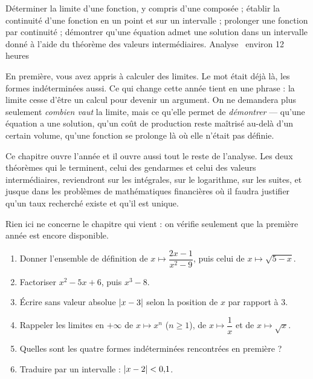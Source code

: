   {Déterminer la limite d'une fonction, y compris d'une composée ; établir la
   continuité d'une fonction en un point et sur un intervalle ; prolonger une
   fonction par continuité ; démontrer qu'une équation admet une solution dans
   un intervalle donné à l'aide du théorème des valeurs intermédiaires.}
  {Analyse \textbullet\ environ 12 heures}

En première, vous avez appris à calculer des limites. Le mot était déjà là,
les formes indéterminées aussi. Ce qui change cette année tient en une
phrase : la limite cesse d'être un calcul pour devenir un argument. On ne
demandera plus seulement \emph{combien vaut} la limite, mais ce qu'elle permet
de \emph{démontrer} — qu'une équation a une solution, qu'un coût de
production reste maîtrisé au-delà d'un certain volume, qu'une fonction se
prolonge là où elle n'était pas définie.

Ce chapitre ouvre l'année et il ouvre aussi tout le reste de l'analyse. Les
deux théorèmes qui le terminent, celui des gendarmes et celui des valeurs
intermédiaires, reviendront sur les intégrales, sur le logarithme, sur les
suites, et jusque dans les problèmes de mathématiques financières où il
faudra justifier qu'un taux recherché existe et qu'il est unique.

\begin{revision}
Rien ici ne concerne le chapitre qui vient : on vérifie seulement que la
première année est encore disponible.

\begin{enumerate}[label=\textbf{\arabic*.}, leftmargin=*, itemsep=0.35em]
  \item Donner l'ensemble de définition de $x \mapsto \dfrac{2x-1}{x^{2}-9}$,
        puis celui de $x \mapsto \sqrt{5-x}$.
  \item Factoriser $x^{2}-5x+6$, puis $x^{3}-8$.
  \item Écrire sans valeur absolue $\left|x-3\right|$ selon la position de $x$ par
        rapport à $3$.
  \item Rappeler les limites en $+\infty$ de $x \mapsto x^{n}$ ($n \geq 1$),
        de $x \mapsto \dfrac{1}{x}$ et de $x \mapsto \sqrt{x}$.
  \item Quelles sont les quatre formes indéterminées rencontrées en première ?
  \item Traduire par un intervalle : $\left|x-2\right| < 0{,}1$.
\end{enumerate}
\end{revision}

